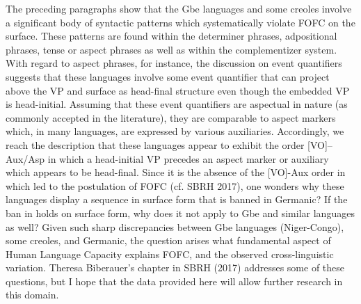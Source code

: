 \documentclass[output=paper]{langsci/langscibook}
\begin{document}
The preceding paragraphs show that the Gbe languages and some creoles involve a
significant body of syntactic patterns which systematically violate \gls{FOFC} on the
surface. These patterns are found within the determiner phrases, adpositional
phrases, tense or aspect phrases as well as within the complementizer system.
With regard to aspect phrases, for instance, the discussion on event
quantifiers suggests that these languages involve some event quantifier that
can project above the VP and surface as head-final structure even though the
embedded VP is head-initial. Assuming that these event quantifiers are
aspectual in nature (as commonly accepted in the literature), they are
comparable to aspect markers which, in many languages, are expressed by various
auxiliaries. Accordingly, we reach the description that these languages appear
to exhibit the order [VO]--Aux/Asp in which a head-initial VP precedes an
aspect marker or auxiliary which appears to be head-final. Since it is the
absence of the [VO]-Aux order in  which led to the postulation of
\gls{FOFC} (cf. SBRH 2017), one wonders why these languages display a sequence
in surface form that is banned in Germanic? If the ban in  holds on
surface form, why does it not apply to Gbe and similar languages as well? Given
such sharp discrepancies between Gbe languages (Niger-Congo), some creoles, and
Germanic, the question arises what fundamental aspect of Human Language
Capacity explains FOFC, and the observed cross-linguistic variation. Theresa
Biberauer’s chapter in SBRH (2017) addresses some of these questions, but I
hope that the data provided here will allow further research in this domain.

\printchapterglossary{}


{\sloppy
\printbibliography[heading=subbibliography,notkeyword=this]
}
\end{document}
